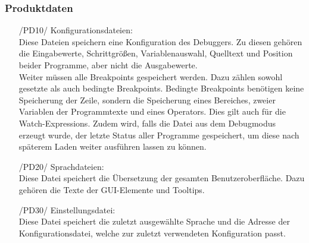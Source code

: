 \documentclass[parskip=full]{scrartcl}
\begin{document}
		\subsubsection{Produktdaten}
		\begin{itemize}
		
		
			\item[/PD10/] Konfigurationsdateien: \\
			Diese Dateien speichern eine Konfiguration des Debuggers. 
			Zu diesen gehören die Eingabewerte, Schrittgrößen, Variablenauswahl, Quelltext und Position beider Programme, aber nicht die Ausgabewerte. \\
			Weiter müssen alle Breakpoints gespeichert werden. Dazu zählen sowohl gesetzte als auch bedingte Breakpoints. Bedingte Breakpoints benötigen keine Speicherung der Zeile, 			sondern die Speicherung eines Bereiches, zweier Variablen der Programmtexte und eines Operators. Dies gilt auch für die Watch-Expressions.
			Zudem wird, falls die Datei aus dem Debugmodus erzeugt wurde, der letzte Status aller Programme gespeichert, um diese nach späterem Laden weiter ausführen lassen zu können. 
			
			\item[/PD20/] Sprachdateien: \\
			Diese Datei speichert die Übersetzung der gesamten Benutzeroberfläche.
			Dazu gehören die Texte der GUI-Elemente und Tooltips.
			
			\item[/PD30/] Einstellungsdatei: \\
			Diese Datei speichert die zuletzt ausgewählte Sprache und die Adresse der Konfigurationsdatei, welche zur zuletzt verwendeten Konfiguration passt.
			
			\end{itemize}
			
			 
\end{document}
